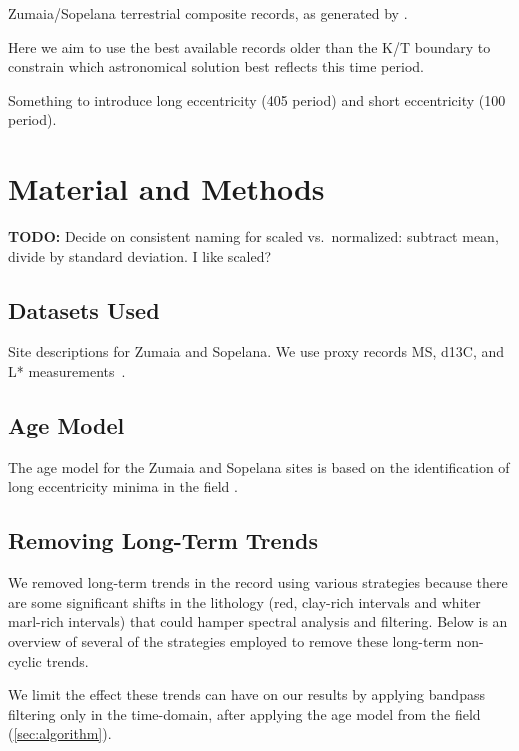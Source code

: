\documentclass[draft]{agujournal2019}
\begin{document}
Zumaia/Sopelana terrestrial composite records, as generated by .

Here we aim to use the best available records older than the K/T boundary to constrain which astronomical solution best reflects this time period.

Something to introduce long eccentricity (\qty{405}{\kiloyear} period) and short eccentricity (\qty{100}{\kiloyear} period).

\section{Material and Methods}\label{sec:mm}

\textbf{TODO:} Decide on consistent naming for scaled vs.\ normalized: subtract mean, divide by standard deviation. I like scaled?

\subsection{Datasets Used}\label{sec:data}

Site descriptions for Zumaia and Sopelana.
We use proxy records \gls{MS}, \gls{d13C}, and \gls{L*} measurements~\cite{Batenburg2012,Batenburg2014}.

\subsection{Age Model}\label{sec:agemodel}

The age model for the Zumaia and Sopelana sites is based on the identification of long eccentricity minima in the field .

\subsection{Removing Long-Term Trends}\label{sec:detrend}

We removed long-term trends in the record using various strategies because there are some significant shifts in the lithology (red, clay-rich intervals and whiter marl-rich intervals) that could hamper spectral analysis and filtering.
Below is an overview of several of the strategies employed to remove these long-term non-cyclic trends.

We limit the effect these trends can have on our results by applying bandpass filtering only in the time-domain, after applying the age model from the field (\cref{sec:algorithm}).
\end{document}
